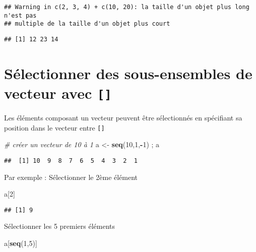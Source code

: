 \documentclass[]{book}
\newenvironment{Shaded}{\begin{snugshade}}{\end{snugshade}}
\newcommand{\CommentTok}[1]{\textcolor[rgb]{0.56,0.35,0.01}{\textit{#1}}}
\newcommand{\DecValTok}[1]{\textcolor[rgb]{0.00,0.00,0.81}{#1}}
\newcommand{\KeywordTok}[1]{\textcolor[rgb]{0.13,0.29,0.53}{\textbf{#1}}}
\newcommand{\NormalTok}[1]{#1}
\newcommand{\OperatorTok}[1]{\textcolor[rgb]{0.81,0.36,0.00}{\textbf{#1}}}
\newcommand{\StringTok}[1]{\textcolor[rgb]{0.31,0.60,0.02}{#1}}
\begin{document}
\begin{verbatim}
## Warning in c(2, 3, 4) + c(10, 20): la taille d'un objet plus long n'est pas
## multiple de la taille d'un objet plus court
\end{verbatim}

\begin{verbatim}
## [1] 12 23 14
\end{verbatim}

\hypertarget{selectionner-des-sous-ensembles-de-vecteur-avec}{%
\section{\texorpdfstring{Sélectionner des sous-ensembles de vecteur avec \texttt{{[}{]}}}{Sélectionner des sous-ensembles de vecteur avec {[}{]}}}\label{selectionner-des-sous-ensembles-de-vecteur-avec}}

Les éléments composant un vecteur peuvent être sélectionnés en spécifiant sa position dans le vecteur entre \texttt{{[}{]}}

\begin{Shaded}
\begin{Highlighting}[]
\CommentTok{# créer un vecteur de 10 à 1}
\NormalTok{a <-}\StringTok{ }\KeywordTok{seq}\NormalTok{(}\DecValTok{10}\NormalTok{,}\DecValTok{1}\NormalTok{,}\OperatorTok{-}\DecValTok{1}\NormalTok{) ; a}
\end{Highlighting}
\end{Shaded}

\begin{verbatim}
##  [1] 10  9  8  7  6  5  4  3  2  1
\end{verbatim}

Par exemple : Sélectionner le 2ème élément

\begin{Shaded}
\begin{Highlighting}[]
\NormalTok{a[}\DecValTok{2}\NormalTok{]}
\end{Highlighting}
\end{Shaded}

\begin{verbatim}
## [1] 9
\end{verbatim}

Sélectionner les 5 premiers éléments

\begin{Shaded}
\begin{Highlighting}[]
\NormalTok{a[}\KeywordTok{seq}\NormalTok{(}\DecValTok{1}\NormalTok{,}\DecValTok{5}\NormalTok{)]}
\end{Highlighting}
\end{Shaded}
\end{document}
